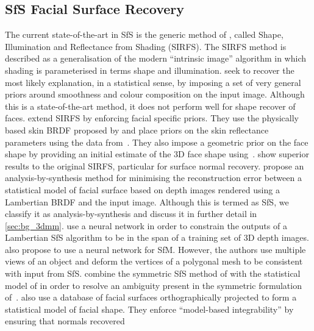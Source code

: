 \subsection{SfS Facial Surface Recovery}
The current state-of-the-art in SfS is the generic method of
\citet{barron2015shape}, called
Shape, Illumination and Reflectance from Shading (SIRFS). The SIRFS method is
described as a generalisation of the modern ``intrinsic image'' algorithm in
which shading is parameterised in terms shape and illumination.
\citet{barron2015shape} seek to recover the most likely explanation, in a
statistical sense, by imposing a set of very general priors around smoothness
and colour composition on the input image. Although this is a state-of-the-art
method, it does not perform well for shape recover of faces.
\citet{li2014intrinsic} extend SIRFS by enforcing facial specific priors. They
use the physically based skin BRDF proposed by \citet{weyrich2006analysis} and
place priors on the skin reflectance parameters using the data
from~\cite{weyrich2006analysis}. They also impose a geometric prior on the face
shape by providing an initial estimate of the 3D face shape
using~\cite{Yang:2011gj}. \citet{li2014intrinsic} show superior results to the
original SIRFS, particular for surface normal recovery.
\citet{atick1996statistical} propose an analysis-by-synthesis method
for minimising the reconstruction error between a statistical model of facial
surface based on depth images rendered using a Lambertian BRDF and the input
image. Although this is termed as SfS, we classify it as analysis-by-synthesis
and discuss it in further detail in \cref{sec:bg_3dmm}.
\citet{yuan2002sfs} use a neural network in order to constrain the outputs
of a Lambertian SfS algorithm to be in the span of a training set of 3D
depth images.
\citet{fanany2004neural,fanany2002analysis} also propose to use a neural network
for SfM. However, the authors use multiple views of an object and deform
the vertices of a polygonal mesh to be consistent with input from SfS.
\citet{dovgard2004statistical} combine the symmetric SfS method of
\citet{yilmaz2002estimation} with the statistical model of
\citet{atick1996statistical} in order to resolve an ambiguity present in
the symmetric formulation of~\cite{yilmaz2002estimation}.
\citet{smith2010estimating} also use a database of facial surfaces
orthographically projected to form a statistical model of facial shape. They
enforce ``model-based integrability'' by ensuring that normals recovered
